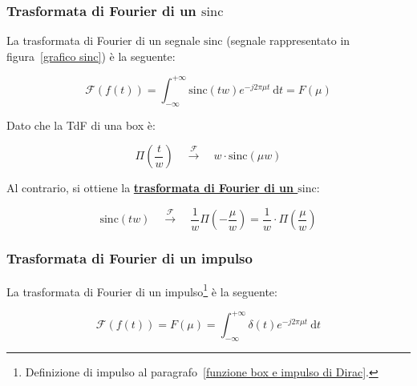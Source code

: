 \documentclass[a4paper]{article}
\begin{document}
	\newpage

	\subsubsection[Trasformata di Fourier di un $\mathrm{sinc}$]{Trasformata di Fourier di un $\boldsymbol{\mathrm{sinc}}$}
	
	La trasformata di Fourier di un segnale $\mathrm{sinc}$ (segnale rappresentato in figura~\ref{grafico sinc}) è la seguente:
	
	\begin{equation*}
		\mathcal{F}\left(f\left(t\right)\right) = \int_{-\infty}^{+\infty} \mathrm{sinc}\left(tw\right) e^{-j 2 \pi \mu t} \: \mathrm{d}t = F\left(\mu\right)
	\end{equation*}

	\noindent
	Dato che la TdF di una box è:
	
	\begin{equation*}
		\Pi\left(\dfrac{t}{w}\right) \hspace{1em} \xrightarrow{\mathcal{F}} \hspace{1em} w \cdot \mathrm{sinc} \left(\mu w\right)
	\end{equation*}

	\noindent
	Al contrario, si ottiene la \textbf{\underline{trasformata di Fourier di un $\mathrm{sinc}$}}:
	
	\begin{equation*}
		\mathrm{sinc}\left(tw\right) \hspace{1em} \xrightarrow{\mathcal{F}} \hspace{1em} \dfrac{1}{w} \Pi \left(-\dfrac{\mu}{w}\right) = \dfrac{1}{w} \cdot \Pi \left(\dfrac{\mu}{w}\right)
	\end{equation*}

	\newpage

	\subsubsection{Trasformata di Fourier di un impulso}
	
	La trasformata di Fourier di un impulso\footnote{Definizione di impulso al paragrafo~\ref{funzione box e impulso di Dirac}.} è la seguente:
	
	\begin{equation*}
		\mathcal{F}\left(f\left(t\right)\right) = F\left(\mu\right) = \int_{-\infty}^{+\infty} \delta\left(t\right) e^{-j 2 \pi \mu t} \: \mathrm{d}t
	\end{equation*}
\end{document}
